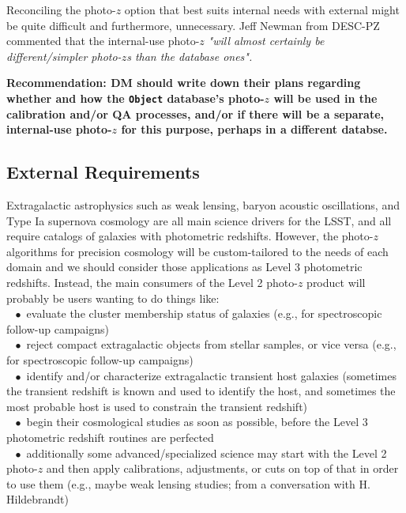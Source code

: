 \documentclass[DM,lsstdraft,toc]{lsstdoc}
\begin{document}
Reconciling the photo-$z$ option that best suits internal needs with external might be quite difficult and furthermore, unnecessary. Jeff Newman from DESC-PZ commented that the internal-use photo-$z$ \textit{"will almost certainly be different/simpler photo-$z$s than the database ones".}

\textbf{Recommendation: DM should write down their plans regarding whether and how the \texttt{Object} database's photo-$z$ will be used in the calibration and/or QA processes, and/or if there will be a separate, internal-use photo-$z$ for this purpose, perhaps in a different databse.}

\subsection{External Requirements}\label{ssec:motivation_external}

Extragalactic astrophysics such as weak lensing, baryon acoustic oscillations, and Type Ia supernova cosmology are all main science drivers for the LSST, and all require catalogs of galaxies with photometric redshifts. However, the photo-$z$ algorithms for precision cosmology will be custom-tailored to the needs of each domain and we should consider those applications as Level 3 photometric redshifts. Instead, the main consumers of the Level 2 photo-$z$ product will probably be users wanting to do things like: \\
$\mathrm{\ \ \ }\bullet$ evaluate the cluster membership status of galaxies (e.g., for spectroscopic follow-up campaigns)\\
$\mathrm{\ \ \ }\bullet$ reject compact extragalactic objects from stellar samples, or vice versa (e.g., for spectroscopic follow-up campaigns) \\
$\mathrm{\ \ \ }\bullet$ identify and/or characterize extragalactic transient host galaxies (sometimes the transient redshift is known and used to identify the host, and sometimes the most probable host is used to constrain the transient redshift) \\
$\mathrm{\ \ \ }\bullet$ begin their cosmological studies as soon as possible, before the Level 3 photometric redshift routines are perfected \\
$\mathrm{\ \ \ }\bullet$ additionally some advanced/specialized science may start with the Level 2 photo-$z$ and then apply calibrations, adjustments, or cuts on top of that in order to use them (e.g., maybe weak lensing studies; from a conversation with H. Hildebrandt)
\end{document}
